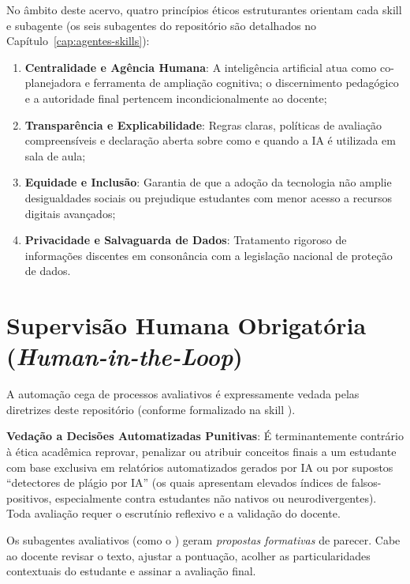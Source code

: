 No {\^a}mbito deste acervo, quatro princ{\'i}pios {\'e}ticos estruturantes orientam cada skill e subagente (os seis subagentes do reposit{\'o}rio s{\~a}o detalhados no Cap{\'i}tulo~\ref{cap:agentes-skills}):
\begin{enumerate}
  \item \textbf{Centralidade e Ag{\^e}ncia Humana}: A intelig{\^e}ncia artificial atua como co-planejadora e ferramenta de amplia{\c c}{\~a}o cognitiva; o discernimento pedag{\'o}gico e a autoridade final pertencem incondicionalmente ao docente;
  \item \textbf{Transpar{\^e}ncia e Explicabilidade}: Regras claras, pol{\'i}ticas de avalia{\c c}{\~a}o compreens{\'i}veis e declara{\c c}{\~a}o aberta sobre como e quando a IA {\'e} utilizada em sala de aula;
  \item \textbf{Equidade e Inclus{\~a}o}: Garantia de que a ado{\c c}{\~a}o da tecnologia n{\~a}o amplie desigualdades sociais ou prejudique estudantes com menor acesso a recursos digitais avan{\c c}ados;
  \item \textbf{Privacidade e Salvaguarda de Dados}: Tratamento rigoroso de informa{\c c}{\~o}es discentes em conson{\^a}ncia com a legisla{\c c}{\~a}o nacional de prote{\c c}{\~a}o de dados.
\end{enumerate}

\section{Supervis{\~a}o Humana Obrigat{\'o}ria (\emph{Human-in-the-Loop})}

A automa{\c c}{\~a}o cega de processos avaliativos {\'e} expressamente vedada pelas diretrizes deste reposit{\'o}rio (conforme formalizado na skill ).

\begin{atencaopedagogica}
\textbf{Veda{\c c}{\~a}o a Decis{\~o}es Automatizadas Punitivas}: {\'E} terminantemente contr{\'a}rio {\`a} {\'e}tica acad{\^e}mica reprovar, penalizar ou atribuir conceitos finais a um estudante com base exclusiva em relat{\'o}rios automatizados gerados por IA ou por supostos ``detectores de pl{\'a}gio por IA'' (os quais apresentam elevados {\'i}ndices de falsos-positivos, especialmente contra estudantes n{\~a}o nativos ou neurodivergentes). Toda avalia{\c c}{\~a}o requer o escrut{\'i}nio reflexivo e a valida{\c c}{\~a}o do docente.
\end{atencaopedagogica}

Os subagentes avaliativos (como o ) geram \emph{propostas formativas} de parecer. Cabe ao docente revisar o texto, ajustar a pontua{\c c}{\~a}o, acolher as particularidades contextuais do estudante e assinar a avalia{\c c}{\~a}o final.

